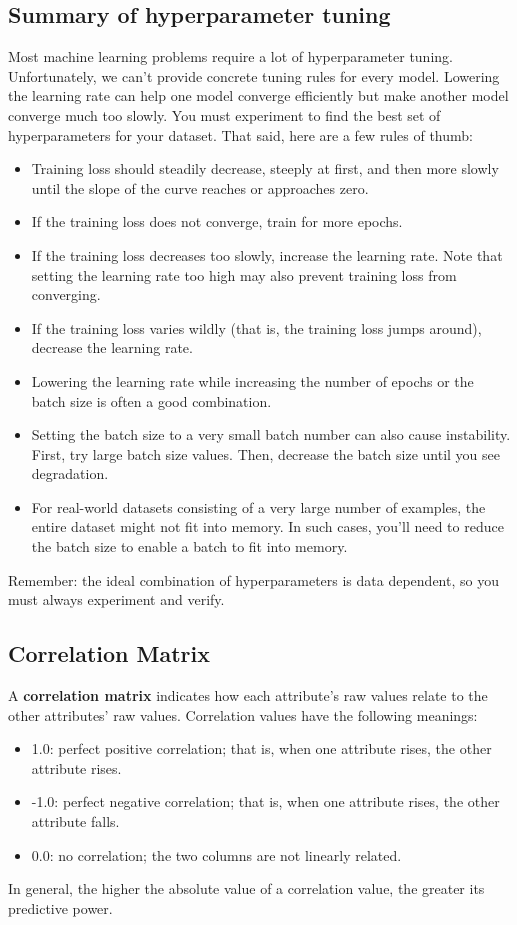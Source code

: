 \documentclass[12pt]{article}
\begin{document}
\subsection{Summary of hyperparameter tuning}
Most machine learning problems require a lot of hyperparameter tuning. Unfortunately, we can't provide concrete tuning rules for every model. Lowering the learning rate can help one model converge efficiently but make another model converge much too slowly. You must experiment to find the best set of hyperparameters for your dataset. That said, here are a few rules of thumb:
\begin{itemize}
	\item Training loss should steadily decrease, steeply at first, and then more slowly until the slope of the curve reaches or approaches zero.
	\item If the training loss does not converge, train for more epochs.
	\item If the training loss decreases too slowly, increase the learning rate. Note that setting the learning rate too high may also prevent training loss from converging.
	\item If the training loss varies wildly (that is, the training loss jumps around), decrease the learning rate.
	\item Lowering the learning rate while increasing the number of epochs or the batch size is often a good combination.
	\item Setting the batch size to a very small batch number can also cause instability. First, try large batch size values. Then, decrease the batch size until you see degradation.
	\item For real-world datasets consisting of a very large number of examples, the entire dataset might not fit into memory. In such cases, you'll need to reduce the batch size to enable a batch to fit into memory.
\end{itemize}
Remember: the ideal combination of hyperparameters is data dependent, so you must always experiment and verify.

\subsection{Correlation Matrix}
A \textbf{correlation matrix} indicates how each attribute's raw values relate to the other attributes' raw values. Correlation values have the following meanings:
\begin{itemize}
	\item 1.0: perfect positive correlation; that is, when one attribute rises, the other attribute rises.
	\item -1.0: perfect negative correlation; that is, when one attribute rises, the other attribute falls.
	\item 0.0: no correlation; the two columns are not linearly related.
\end{itemize}
In general, the higher the absolute value of a correlation value, the greater its predictive power. 
\end{document}
